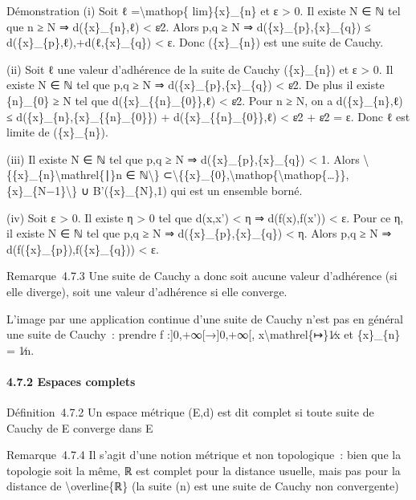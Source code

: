 \documentclass[]{article}
\begin{document}
Démonstration (i) Soit ℓ =\textbackslash{}mathop\{ lim\}\{x\}\_\{n\} et
ε \textgreater{} 0. Il existe N ∈ ℕ tel que n ≥ N ⇒ d(\{x\}\_\{n\},ℓ)
\textless{} ε∕2. Alors p,q ≥ N ⇒ d(\{x\}\_\{p\},\{x\}\_\{q\}) ≤
d(\{x\}\_\{p\},ℓ),+d(ℓ,\{x\}\_\{q\}) \textless{} ε. Donc (\{x\}\_\{n\})
est une suite de Cauchy.

(ii) Soit ℓ une valeur d'adhérence de la suite de Cauchy (\{x\}\_\{n\})
et ε \textgreater{} 0. Il existe N ∈ ℕ tel que p,q ≥ N ⇒
d(\{x\}\_\{p\},\{x\}\_\{q\}) \textless{} ε∕2. De plus il existe
\{n\}\_\{0\} ≥ N tel que d(\{x\}\_\{\{n\}\_\{0\}\},ℓ) \textless{} ε∕2.
Pour n ≥ N, on a d(\{x\}\_\{n\},ℓ) ≤
d(\{x\}\_\{n\},\{x\}\_\{\{n\}\_\{0\}\}) + d(\{x\}\_\{\{n\}\_\{0\}\},ℓ)
\textless{} ε∕2 + ε∕2 = ε. Donc ℓ est limite de (\{x\}\_\{n\}).

(iii) Il existe N ∈ ℕ tel que p,q ≥ N ⇒ d(\{x\}\_\{p\},\{x\}\_\{q\})
\textless{} 1. Alors
\textbackslash{}\{\{x\}\_\{n\}\textbackslash{}mathrel\{∣\}n ∈
ℕ\textbackslash{}\}
⊂\textbackslash{}\{\{x\}\_\{0\},\textbackslash{}mathop\{\textbackslash{}mathop\{\ldots{}\}\},\{x\}\_\{N−1\}\textbackslash{}\}
∪ B'(\{x\}\_\{N\},1) qui est un ensemble borné.

(iv) Soit ε \textgreater{} 0. Il existe η \textgreater{} 0 tel que
d(x,x') \textless{} η ⇒ d(f(x),f(x')) \textless{} ε. Pour ce η, il
existe N ∈ ℕ tel que p,q ≥ N ⇒ d(\{x\}\_\{p\},\{x\}\_\{q\}) \textless{}
η. Alors p,q ≥ N ⇒ d(f(\{x\}\_\{p\}),f(\{x\}\_\{q\})) \textless{} ε.

Remarque~4.7.3 Une suite de Cauchy a donc soit aucune valeur d'adhérence
(si elle diverge), soit une valeur d'adhérence si elle converge.

L'image par une application continue d'une suite de Cauchy n'est pas en
général une suite de Cauchy~: prendre f :{]}0,+∞{[}→{]}0,+∞{[},
x\textbackslash{}mathrel\{↦\}1∕x et \{x\}\_\{n\} = 1∕n.

\paragraph{4.7.2 Espaces complets}

Définition~4.7.2 Un espace métrique (E,d) est dit complet si toute suite
de Cauchy de E converge dans E

Remarque~4.7.4 Il s'agit d'une notion métrique et non topologique~: bien
que la topologie soit la même, ℝ est complet pour la distance usuelle,
mais pas pour la distance de \textbackslash{}overline\{ℝ\} (la suite (n)
est une suite de Cauchy non convergente)
\end{document}
